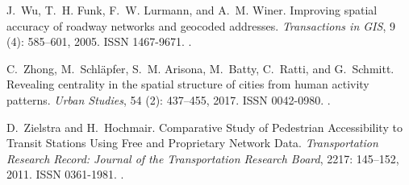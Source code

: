 \documentclass[Afour,sageh,times]{sagej}
\begin{document}
\begin{thebibliography}{54}
	J.~Wu, T.~H. Funk, F.~W. Lurmann, and A.~M. Winer.
	\newblock Improving spatial accuracy of roadway networks and geocoded
	addresses.
	\newblock \emph{Transactions in GIS}, 9 (4): 585--601, 2005.
	\newblock ISSN 1467-9671.
	\newblock {}.
	
	C.~Zhong, M.~Schläpfer, S.~M. Arisona, M.~Batty, C.~Ratti, and G.~Schmitt.
	\newblock Revealing centrality in the spatial structure of cities from human
	activity patterns.
	\newblock \emph{Urban Studies}, 54 (2): 437--455, 2017.
	\newblock ISSN 0042-0980.
	\newblock {}.
	
	D.~Zielstra and H.~Hochmair.
	\newblock Comparative {Study} of {Pedestrian} {Accessibility} to {Transit}
	{Stations} {Using} {Free} and {Proprietary} {Network} {Data}.
	\newblock \emph{Transportation Research Record: Journal of the Transportation
		Research Board}, 2217: 145--152, 2011.
	\newblock ISSN 0361-1981.
	\newblock {}.
	
\end{thebibliography}
\end{document}

